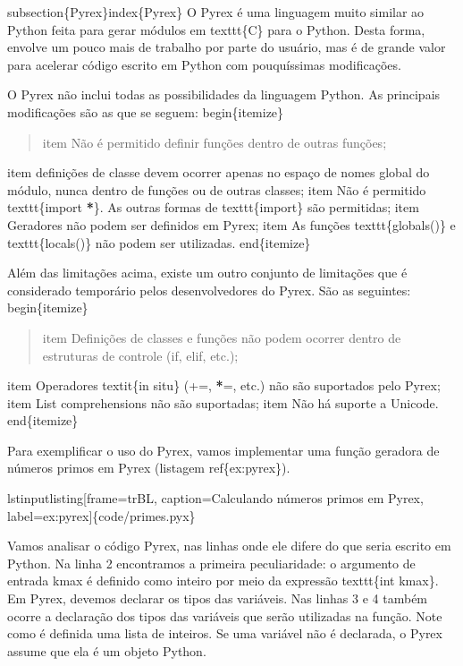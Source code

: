 \documentclass[a4paper,10pt,brazil]{sphinxmanual}
\begin{document}
subsection\{Pyrex\}index\{Pyrex\}
O Pyrex é uma linguagem muito similar ao Python feita para gerar módulos em texttt\{C\} para o Python.
Desta forma, envolve um pouco mais de trabalho por parte do usuário, mas é de grande valor para acelerar código escrito em Python com pouquíssimas modificações.

O Pyrex não inclui todas as possibilidades da linguagem Python. As principais modificações são as que se seguem:
begin\{itemize\}
\begin{quote}

item Não é permitido definir funções dentro de outras funções;
\end{quote}

item definições de classe devem ocorrer apenas no espaço de nomes global do módulo, nunca dentro de funções ou de outras classes;
item Não é permitido texttt\{import {\color{red}\bfseries{}*}\}. As outras formas de texttt\{import\} são permitidas;
item Geradores não podem ser definidos em Pyrex;
item As funções texttt\{globals()\} e texttt\{locals()\} não podem ser utilizadas.
end\{itemize\}

Além das limitações acima, existe um outro conjunto de limitações que é considerado temporário pelos desenvolvedores do Pyrex. São as seguintes:
begin\{itemize\}
\begin{quote}

item Definições de classes e funções não podem ocorrer dentro de estruturas de controle (if, elif, etc.);
\end{quote}

item Operadores textit\{in situ\} (+=, {\color{red}\bfseries{}*}=, etc.) não são suportados pelo Pyrex;
item List comprehensions não são suportadas;
item Não há suporte a Unicode.
end\{itemize\}

Para exemplificar o uso do Pyrex, vamos implementar uma função geradora de números primos em Pyrex (listagem ref\{ex:pyrex\}).

lstinputlisting{[}frame=trBL, caption=Calculando números primos em Pyrex, label=ex:pyrex{]}\{code/primes.pyx\}

Vamos analisar o código Pyrex, nas linhas onde ele difere do que seria escrito em Python. Na linha 2 encontramos a primeira peculiaridade: o argumento de entrada kmax é definido como inteiro por meio da expressão texttt\{int kmax\}. Em Pyrex, devemos declarar os tipos das variáveis. Nas linhas 3 e 4 também ocorre a declaração dos tipos das variáveis que serão utilizadas na função. Note como é definida uma lista de inteiros. Se uma variável não é declarada, o Pyrex assume que ela é um objeto Python.
\end{document}
